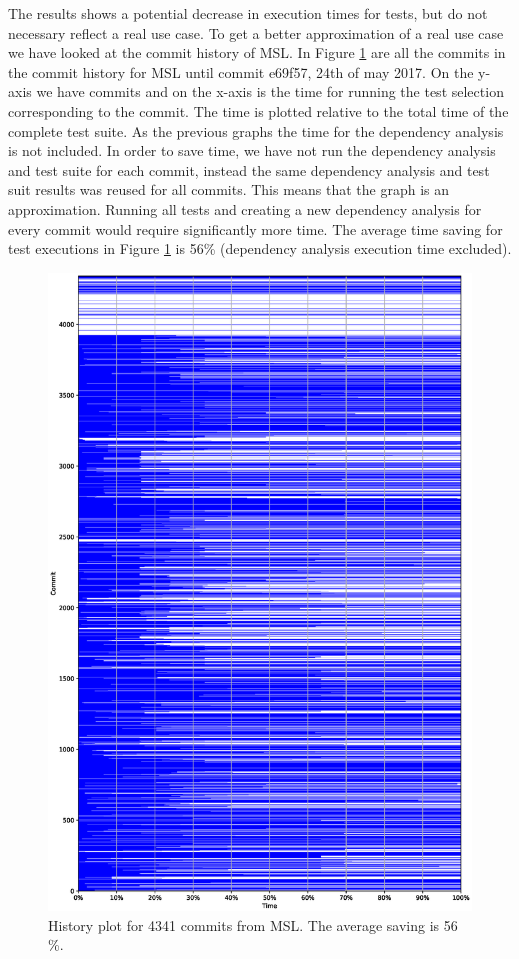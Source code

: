 \documentclass{cslthse-msc}
\begin{document}
The results shows a potential decrease in execution times for tests, but do not necessary reflect a real use case. To get a better approximation of a real use case we have looked at the commit history of MSL. In Figure \ref{fig:mslhistory} are all the commits in the commit history for MSL until commit e69f57, 24th of may 2017. On the y-axis we have commits and on the x-axis is the time for running the test selection corresponding to the commit. The time is plotted relative to the total time of the complete test suite. As the previous graphs the time for the dependency analysis is not included. In order to save time, we have not run the dependency analysis and test suite for each commit, instead the same dependency analysis and test suit results was reused for all commits. This means that the graph is an approximation. Running all tests and creating a new dependency analysis for every commit would require significantly more time. The average time saving for test executions in Figure \ref{fig:mslhistory} is 56\% (dependency analysis execution time excluded).

\begin{figure}[!htbp]
    \centering
    \includegraphics[width=\textwidth]{Graphs/MSL_history_plot.eps}
    \caption{History plot for 4341 commits from MSL. The average saving is 56 \%.}
    \label{fig:mslhistory}
\end{figure}
\end{document}
